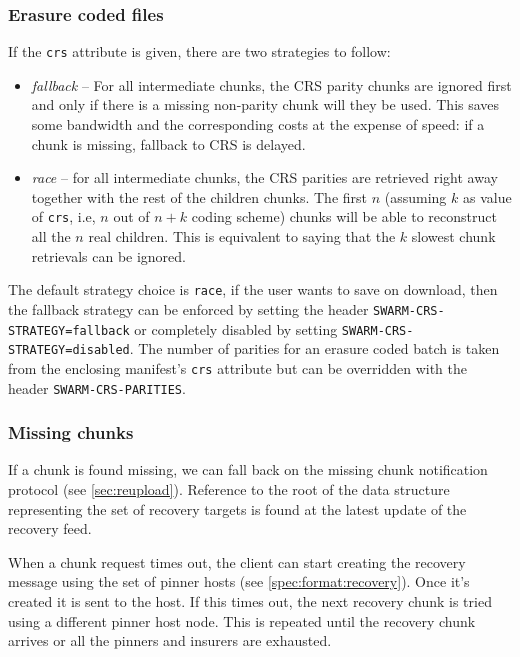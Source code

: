 \subsubsection{Erasure coded files}

If the \lstinline{crs} attribute is given, there are two strategies to follow: 

\begin{itemize}
\item \emph{fallback} -- For all intermediate chunks, the CRS parity chunks are ignored first and only if there is a missing non-parity chunk will they be used. This saves some bandwidth and the corresponding costs at the expense of speed: if a chunk is missing, fallback to CRS is delayed.
\item \emph{race} -- for all intermediate chunks, the CRS parities are retrieved right away together with the rest of the children chunks. The first $n$ (assuming $k$ as value of \lstinline{crs}, i.e, $n$ out of $n+k$ coding scheme) chunks will be able to reconstruct all the $n$ real children. This is equivalent to saying that the $k$ slowest chunk retrievals can be ignored.  
\end{itemize}

The default strategy choice is \lstinline{race}, if the user wants to save on download, then the fallback strategy can be enforced by setting the header \lstinline{SWARM-CRS-STRATEGY=fallback} or completely disabled by setting \lstinline{SWARM-CRS-STRATEGY=disabled}. The number of parities for an erasure coded batch is taken from the enclosing manifest's \lstinline{crs} attribute but can be overridden with the header \lstinline{SWARM-CRS-PARITIES}.

\subsubsection{Missing chunks}

If a chunk is found missing, we can fall back on the missing chunk notification protocol (see \ref{sec:reupload}). Reference to the root of the data structure representing the set of recovery targets is found at the latest update of the recovery feed. 

When a chunk request times out, the client can start creating the recovery message using the set of pinner hosts (see \ref{spec:format:recovery}). Once it's created it is sent to the host. If this times out, the next recovery chunk is tried using a different pinner host node. This is repeated until the recovery chunk arrives or all the pinners and insurers are exhausted.


